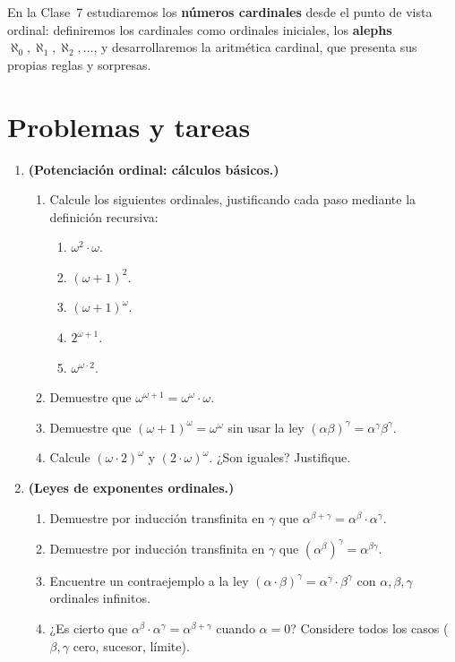 En la Clase~7 estudiaremos los \textbf{números cardinales} desde el punto de vista ordinal: definiremos los cardinales como ordinales iniciales, los \textbf{alephs} $\aleph_0, \aleph_1, \aleph_2, \ldots$, y desarrollaremos la aritmética cardinal, que presenta sus propias reglas y sorpresas.

\section{Problemas y tareas}

\begin{enumerate}[leftmargin=2.5em, label=\textbf{\arabic*.}]

  \item \textbf{(Potenciación ordinal: cálculos básicos.)}
  \begin{enumerate}[label=(\alph*)]
    \item Calcule los siguientes ordinales, justificando cada paso mediante la definición recursiva:
    \begin{enumerate}[label=(\roman*)]
      \item $\omega^2 \cdot \omega$.
      \item $(\omega+1)^2$.
      \item $(\omega+1)^\omega$.
      \item $2^{\omega+1}$.
      \item $\omega^{\omega \cdot 2}$.
    \end{enumerate}
    \item Demuestre que $\omega^{\omega+1} = \omega^\omega \cdot \omega$.
    \item Demuestre que $(\omega+1)^\omega = \omega^\omega$ sin usar la ley $(\alpha\beta)^\gamma = \alpha^\gamma \beta^\gamma$.
    \item Calcule $(\omega \cdot 2)^\omega$ y $(2 \cdot \omega)^\omega$. ¿Son iguales? Justifique.
  \end{enumerate}

  \item \textbf{(Leyes de exponentes ordinales.)}
  \begin{enumerate}[label=(\alph*)]
    \item Demuestre por inducción transfinita en $\gamma$ que $\alpha^{\beta+\gamma} = \alpha^\beta \cdot \alpha^\gamma$.
    \item Demuestre por inducción transfinita en $\gamma$ que $(\alpha^\beta)^\gamma = \alpha^{\beta\gamma}$.
    \item Encuentre un contraejemplo a la ley $(\alpha \cdot \beta)^\gamma = \alpha^\gamma \cdot \beta^\gamma$ con $\alpha, \beta, \gamma$ ordinales infinitos.
    \item ¿Es cierto que $\alpha^\beta \cdot \alpha^\gamma = \alpha^{\beta+\gamma}$ cuando $\alpha = 0$? Considere todos los casos ($\beta, \gamma$ cero, sucesor, límite).
  \end{enumerate}


\end{enumerate}
